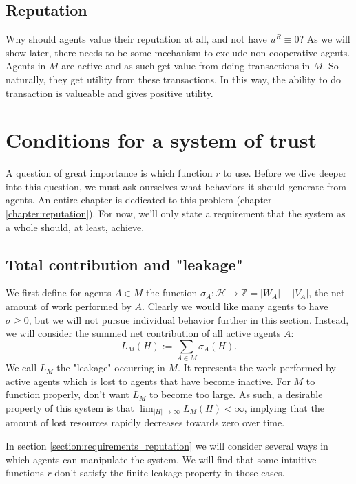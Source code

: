 \subsection{Reputation}
Why should agents value their reputation at all, and not have $u^R \equiv 0$? As we will show later, there needs to be some mechanism to exclude non cooperative agents. Agents in $M$ are active and as such get value from doing transactions in $M$. So naturally, they get utility from these transactions. In this way, the ability to do transaction is valueable and gives positive utility.

\section{Conditions for a system of trust}
A question of great importance is which function $r$ to use. Before we dive deeper into this question, we must ask ourselves what behaviors it should generate from agents. An entire chapter is dedicated to this problem (chapter \ref{chapter:reputation}). For now, we'll only state a requirement that the system as a whole should, at least, achieve.

\subsection{Total contribution and "leakage"}
We first define for agents $A \in M$ the function $\sigma_A: \mathcal{H} \to \mathds{Z} = |W_A| - |V_A|$, the net amount of work performed by $A$. Clearly we would like many agents to have $\sigma \geq 0$, but we will not pursue individual behavior further in this section. Instead, we will consider the summed net contribution of all active agents $A$:
\[L_M(H) := \sum_{A \in M} \sigma_A(H).\]
We call $L_M$ the "leakage" occurring in $M$. It represents the work performed by active agents which is lost to agents that have become inactive. For $M$ to function properly, don't want $L_M$ to become too large. As such, a desirable property of this system is that $\lim_{|H| \to \infty} L_M(H) < \infty$, implying that the amount of lost resources rapidly decreases towards zero over time.

In section \ref{section:requirements_reputation} we will consider several ways in which agents can manipulate the system. We will find that some intuitive functions $r$ don't satisfy the finite leakage property in those cases.

